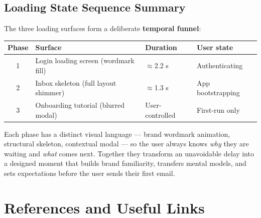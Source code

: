 \documentclass[12pt,a4paper]{report}
\begin{document}
\section{Loading State Sequence Summary}

The three loading surfaces form a deliberate \textbf{temporal funnel}:

\begin{center}
\begin{tabular}{@{}clll@{}}
  \toprule
  \textbf{Phase} & \textbf{Surface} & \textbf{Duration} & \textbf{User state} \\
  \midrule
  1 & Login loading screen (wordmark fill) & $\approx$2.2 s & Authenticating     \\
  2 & Inbox skeleton (full layout shimmer) & $\approx$1.3 s & App bootstrapping  \\
  3 & Onboarding tutorial (blurred modal)  & User-controlled & First-run only     \\
  \bottomrule
\end{tabular}
\end{center}

Each phase has a distinct visual language — brand wordmark animation, structural skeleton,
contextual modal — so the user always knows \textit{why} they are waiting and \textit{what}
comes next. Together they transform an unavoidable delay into a designed moment that builds
brand familiarity, transfers mental models, and sets expectations before the user sends
their first email.

\chapter*{References and Useful Links}
\end{document}
